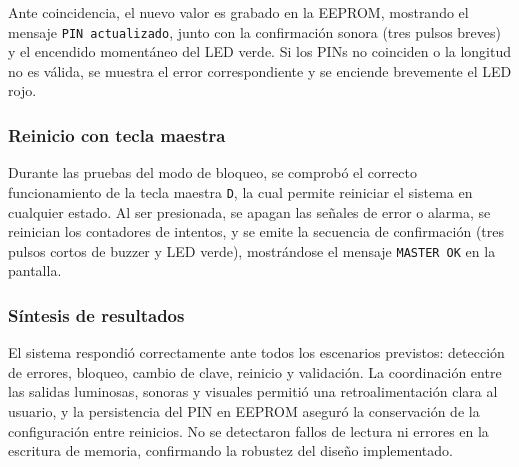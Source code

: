 Ante coincidencia, el nuevo valor es grabado en la EEPROM, mostrando el mensaje \texttt{PIN actualizado}, 
junto con la confirmación sonora (tres pulsos breves) y el encendido momentáneo del LED verde.  
Si los PINs no coinciden o la longitud no es válida, se muestra el error correspondiente y se enciende brevemente el LED rojo.

\subsubsection{Reinicio con tecla maestra}

Durante las pruebas del modo de bloqueo, se comprobó el correcto funcionamiento de la tecla maestra \texttt{D}, 
la cual permite reiniciar el sistema en cualquier estado.  
Al ser presionada, se apagan las señales de error o alarma, se reinician los contadores de intentos, 
y se emite la secuencia de confirmación (tres pulsos cortos de buzzer y LED verde), 
mostrándose el mensaje \texttt{MASTER OK} en la pantalla.

\subsubsection{Síntesis de resultados}

El sistema respondió correctamente ante todos los escenarios previstos: 
detección de errores, bloqueo, cambio de clave, reinicio y validación.  
La coordinación entre las salidas luminosas, sonoras y visuales permitió una retroalimentación clara al usuario, 
y la persistencia del PIN en EEPROM aseguró la conservación de la configuración entre reinicios.  
No se detectaron fallos de lectura ni errores en la escritura de memoria, 
confirmando la robustez del diseño implementado.
